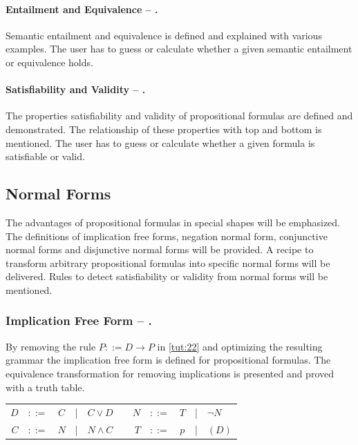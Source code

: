 \paragraph{Entailment and Equivalence – .}
\label{tut:33}
Semantic entailment and equivalence is defined and explained with various examples.
The user has to guess or calculate whether a given semantic entailment or equivalence holds. 

\paragraph{Satisfiability and Validity – .}
\label{tut:34}
The properties satisfiability and validity of propositional formulas are defined and demonstrated. 
The relationship of these properties with top and bottom is mentioned. 
The user has to guess or calculate whether a given formula is satisfiable or valid.

\subsection{Normal Forms}

The advantages of propositional formulas in special shapes will be emphasized.
The definitions of implication free forms, negation normal form, 
conjunctive normal forms and disjunctive normal forms will be provided. 
A recipe to transform arbitrary propositional formulas into specific normal forms will be delivered.
Rules to detect satisfiability or validity from normal forms will be mentioned.

\subsubsection{Implication Free Form – .}
\label{tut:41}
By removing the rule $P ::= D \rightarrow P$ in \vref{tut:22} 
and optimizing the resulting grammar
the implication free form is defined for propositional formulas.
The equivalence transformation
for removing implications is presented
and proved with a truth table. 

\begin{center}
\begin{tabular}{rccclp{1cm}rcccl}
$D$		&$::=$ & $C$ &|& $C \vee D$		&& $N$		&$::=$ & $T$ &|& $\neg N$	\\
$C$		&$::=$ & $N$ &|& $N \wedge C$ 	&& $T$		&$::=$ & $p$ &|& $(D)$	\\
\end{tabular}
\end{center}

